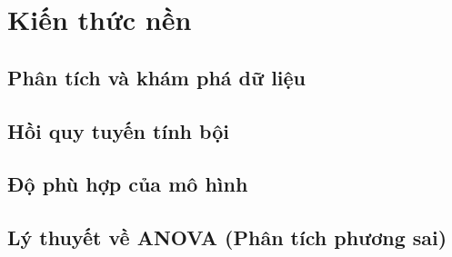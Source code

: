 \section{Kiến thức nền}
\subsection{Phân tích và khám phá dữ liệu}
\subsection{Hồi quy tuyến tính bội}
\subsection{Độ phù hợp của mô hình}
\subsection{Lý thuyết về ANOVA (Phân tích phương sai)}